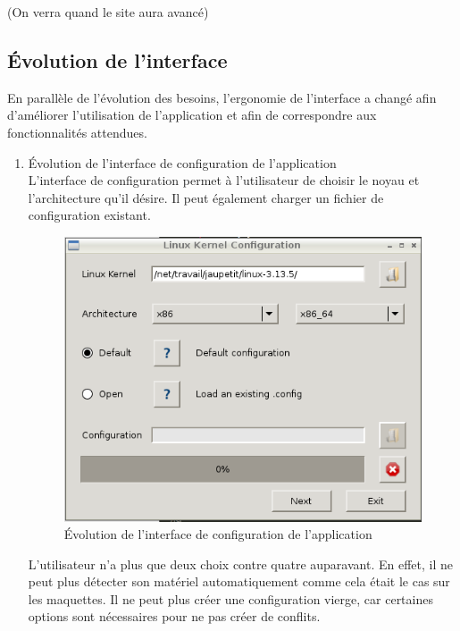 \documentclass[16pts]{report}
\begin{document}
(On verra quand le site aura avancé)

        \subsection{Évolution de l'interface}
        \label{sub:Évolution de l'interface}

En parallèle de l'évolution des besoins, l'ergonomie de l'interface a changé 
afin d'améliorer l'utilisation de l'application et afin de correspondre aux 
fonctionnalités attendues.

\begin{enumerate}

	\item Évolution de l'interface de configuration de l'application
	\\

	L'interface de configuration permet à l'utilisateur de choisir le noyau 
	et l'architecture qu'il désire. Il peut également charger un fichier de 
	configuration existant.

	\begin{figure}[H]
		\includegraphics[scale=0.7]{./illustrations/screen_configuration_interface.png}
		\centering
		\caption{Évolution de l'interface de configuration de l'application}
		\label{fig:Evo_config}
	\end{figure}

	L'utilisateur n'a plus que deux choix contre quatre auparavant. En effet, 
	il ne peut plus détecter son matériel automatiquement comme cela était 
	le cas sur les maquettes. Il ne peut plus créer une configuration vierge, 
	car certaines options sont nécessaires pour ne pas créer de conflits.
	\\


\end{enumerate}
\end{document}
